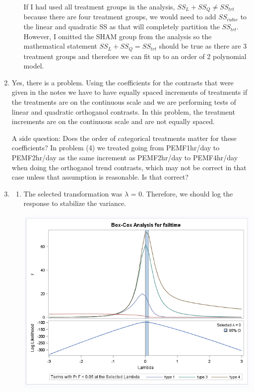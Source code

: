 \documentclass{article}\usepackage[]{graphicx}\usepackage[]{color}
\begin{document}
\begin{enumerate}
\begin{enumerate}
If I had used all treatment groups in the analysis, $SS_{L} + SS_{Q} \neq SS_{trt}$ because there are four treatment groups, we would need to add $SS_{cubic}$ to the linear and quadratic SS as that will completely partition the $SS_{trt}$. However, I omitted the SHAM group from the analysis so the mathematical statement $SS_{L} + SS_{Q} = SS_{trt}$ should be true as there are 3 treatment groups and therefore we can fit up to an order of 2 polynomial model.
\end{enumerate}
\item %

Yes, there is a problem. Using the coefficients for the contrasts that were given in the notes we have to have equally spaced increments of treatments if the treatments are on the continuous scale and we are performing tests of linear and quadratic orthoganol contrasts. In this problem, the treatment increments are on the continuous scale and are not equally spaced.

A side question: Does the order of categorical treatments matter for these coefficients? In problem (4) we treated going from PEMF1hr/day to PEMF2hr/day as the same increment as PEMF2hr/day to PEMF4hr/day when doing the orthoganol trend contrasts, which may not be correct in that case unless that assumption is reasonable. Is that correct?

\item %

\begin{enumerate}

\item %



The selected transformation was $\lambda$ = 0. Therefore, we should log the response to stabilize the variance. 

\begin{center}
\includegraphics[scale=0.5]{prob6}


\end{center}
\end{enumerate}
\end{enumerate}
\end{document}
